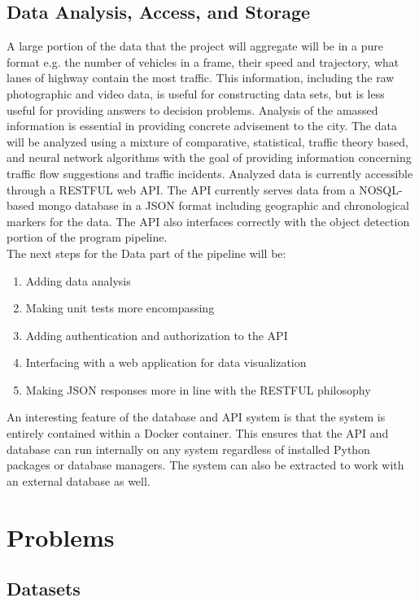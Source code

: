 \documentclass[onecolumn, draftclsnofoot,10pt, compsoc]{IEEEtran}
\begin{document}

\subsection{Data Analysis, Access, and Storage}
A large portion of the data that the project will aggregate will be in a pure format e.g. the number of vehicles in a frame, their speed and trajectory, what lanes of highway contain the most traffic. This information, including the raw photographic and video data, is useful for constructing data sets, but is less useful for providing answers to decision problems. Analysis of the amassed information is essential in providing concrete advisement to the city.  
The data will be analyzed using a mixture of comparative, statistical,  traffic  theory  based,  and  neural  network  algorithms with the goal of providing information concerning traffic flow suggestions and traffic incidents. 
Analyzed data is currently accessible through a RESTFUL web API. The API currently serves data from a NOSQL-based mongo database in a JSON format including geographic and chronological markers for the data.
The API also interfaces correctly with the object detection portion of the program pipeline.\\
The next steps for the Data part of the pipeline will be:
\begin{enumerate}
    \item Adding data analysis
    \item Making unit tests more encompassing
    \item Adding authentication and authorization to the API
    \item Interfacing with a web application for data visualization
    \item Making JSON responses more in line with the RESTFUL philosophy
\end{enumerate}
An interesting feature of the database and API system is that the system is entirely contained within a Docker container. This ensures that the API and database can run internally on any system regardless of installed Python packages or database managers. The system can also be extracted to work with an external database as well. 

\section{Problems}
\subsection{Datasets}
\end{document}
